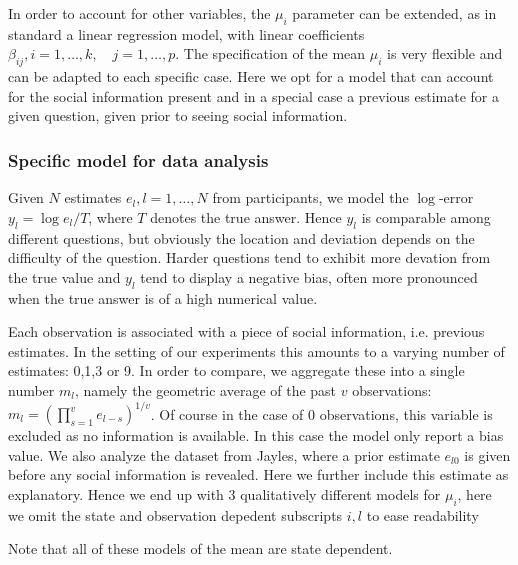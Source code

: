 \documentclass[10pt,a4paper,twocolumn,lineno]{article}
\begin{document}
In order to account for other variables, the $\mu_i$ parameter can be extended, as in standard a linear regression model, with linear coefficients $\beta_{ij}, i=1,\dots,k, \quad j=1,\dots,p$. The specification of the mean $\mu_i$ is very flexible and can be adapted to each specific case. Here we opt for a model that can account for the social information present and in a special case a previous estimate for a given question, given prior to seeing social information.

\subsubsection{Specific model for data analysis}
\noindent
Given $N$ estimates $e_l, l=1,\dots,N$ from participants, we model the $\log$-error $y_l = \log e_l/T$, where $T$ denotes the true answer. Hence $y_l$ is comparable among different questions, but obviously the location and deviation depends on the difficulty of the question. Harder questions tend to exhibit more devation from the true value and $y_l$ tend to display a negative bias, often more pronounced when the true answer is of a high numerical value.

Each observation is associated with a piece of social information, i.e. previous estimates. In the setting of our experiments this amounts to a varying number of estimates: 0,1,3 or 9. In order to compare, we aggregate these into a single number $m_l$, namely the geometric average of the past $v$ observations: $m_l=\left(\prod_{s=1}^v e_{l-s} \right)^{1/v}$. Of course in the case of 0 observations, this variable is excluded as no information is available. In this case the model only report a bias value. We also analyze the dataset from Jayles, where a prior estimate $e_{l0}$ is given before any social information is revealed. Here we further include this estimate as explanatory. Hence we end up with 3 qualitatively different models for $\mu_i$, here we omit the state and observation depedent subscripts $i, l$ to ease readability

Note that all of these models of the mean are state dependent.
\end{document}
